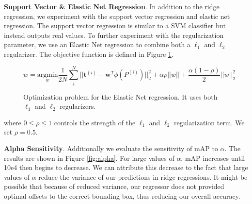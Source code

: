 \documentclass[10pt,twocolumn,letterpaper]{article}
\begin{document}
    \textbf{Support Vector \& Elastic Net Regression}. In addition to the ridge regression, we experiment with the support vector regression and elastic net regression. The support vector regression is similar to a SVM classifier but instead outputs real values. To further experiment with the regularization parameter, we use an Elastic Net regression \cite{zou2005regularization} to combine both a $\ell_1$ and $\ell_2$ regularizer. The objective function is defined in Figure \ref{fig:elastic_net}.
\begin{figure}[t!]
\vspace{-4mm}
\begin{equation*}
w = \underset{w}{\textrm{argmin}} \frac{1}{2N} \sum_{i}^{N} || \mathbf{t}^{(i)} - \mathbf{w}^T \phi(P^{(i)})||^2_2 + \alpha \rho || w || + \frac{\alpha (1-\rho)}{2} || w ||^2_2
\end{equation*}
\caption{Optimization problem for the Elastic Net regression. It uses both $\ell_1$ and $\ell_2$ regularizers.}
\label{fig:elastic_net}
\end{figure}
where $0 \leq \rho \leq 1$ controls the strength of the $\ell_1$ and $\ell_2$ regularization term. We set $\rho=0.5$.

\textbf{Alpha Sensitivity}. Additionally we evaluate the sensitivity of mAP to $\alpha $. The results are shown in Figure \ref{fig:alpha}. For large values of $\alpha$, mAP increases until 10e4 then begins to decrease. We can attribute this decrease to the fact that large values of $\alpha$ reduce the variance of our predictions in ridge regressions. It might be possible that because of reduced variance, our regressor does not provided optimal offsets to the correct bounding box, thus reducing our overall accuracy.
\end{document}
